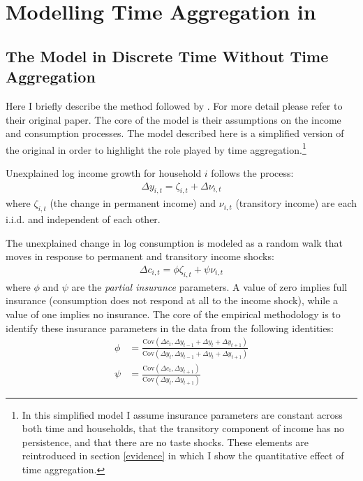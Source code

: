 \documentclass[AER]{AEA}
\begin{document}
\section{Modelling Time Aggregation in \cite{blundell_consumption_2008}} \label{BPP}

\subsection{The Model in Discrete Time Without Time Aggregation}
Here I briefly describe the method followed by \cite{blundell_consumption_2008}. For more detail please refer to their original paper. The core of the model is their assumptions on the income and consumption processes. The model described here is a simplified version of the original in order to highlight the role played by time aggregation.\footnote{In this simplified model I assume insurance parameters are constant across both time and households, that the transitory component of income has no persistence, and that there are no taste shocks. These elements are reintroduced in section \ref{evidence} in which I show the quantitative effect of time aggregation.} 

Unexplained log income growth for household $i$ follows the process:
\begin{align*}
\Delta y_{i,t} = \zeta_{i,t} + \Delta \nu_{i,t}
\end{align*}
where $\zeta_{i,t}$ (the change in permanent income) and $\nu_{i,t}$ (transitory income) are each i.i.d. and independent of each other.

The unexplained change in log consumption is modeled as a random walk that moves in response to permanent and transitory income shocks:
\begin{align*}
\Delta c_{i,t} = \phi \zeta_{i,t} + \psi \nu_{i,t} 
\end{align*}
where $\phi$ and $\psi$ are the \textit{partial insurance} parameters. A value of zero implies full insurance (consumption does not respond at all to the income shock), while a value of one implies no insurance. The core of the empirical methodology is to identify these insurance parameters in the data from the following identities:
\begin{align}
\phi&= \frac{\mathrm{Cov}(\Delta c_{t}, \Delta y_{t-1}+\Delta y_{t}+\Delta y_{t+1})}{\mathrm{Cov}(\Delta y_{t}, \Delta y_{t-1}+\Delta y_{t}+\Delta y_{t+1})} \label{phi}\\
\psi&= \frac{\mathrm{Cov}(\Delta c_{t},\Delta y_{t+1})}{\mathrm{Cov}(\Delta y_{t},\Delta y_{t+1})} \label{psi}
\end{align}
\end{document}
